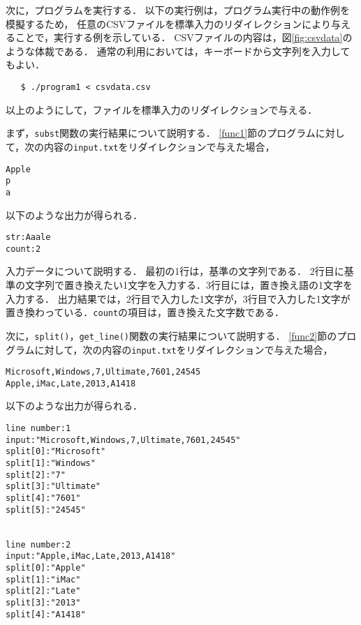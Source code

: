 次に，プログラムを実行する．
以下の実行例は，プログラム実行中の動作例を模擬するため，
任意のCSVファイルを標準入力のリダイレクションにより与えることで，実行する例を示している\cite{www:label1}．
CSVファイルの内容は，図\ref{fig:csvdata}のような体裁である．
通常の利用においては，キーボードから文字列を入力してもよい．

{\fontsize{10pt}{11pt} \selectfont
 \begin{verbatim}
   $ ./program1 < csvdata.csv
 \end{verbatim}
}

以上のようにして，ファイルを標準入力のリダイレクションで与える．

まず，\verb|subst|関数の実行結果について説明する．
\ref{func1}節のプログラムに対して，次の内容の\verb|input.txt|をリダイレクションで与えた場合，

{\fontsize{10pt}{11pt} \selectfont
 \begin{verbatim}
Apple
p
a
 \end{verbatim}
}

\noindent %
以下のような出力が得られる．

{\fontsize{10pt}{11pt} \selectfont
 \begin{verbatim}
str:Aaale
count:2
 \end{verbatim}
}

入力データについて説明する．
最初の1行は，基準の文字列である．
2行目に基準の文字列で置き換えたい1文字を入力する．3行目には，置き換え語の1文字を入力する．
出力結果では，2行目で入力した1文字が，3行目で入力した1文字が置き換わっている．\verb|count|の項目は，置き換えた文字数である．

次に，\verb|split()|，\verb|get_line()|関数の実行結果について説明する．
\ref{func2}節のプログラムに対して，次の内容の\verb|input.txt|をリダイレクションで与えた場合，

{\fontsize{10pt}{11pt} \selectfont
 \begin{verbatim}
Microsoft,Windows,7,Ultimate,7601,24545
Apple,iMac,Late,2013,A1418
 \end{verbatim}
}

\noindent %
以下のような出力が得られる．

{\fontsize{10pt}{11pt} \selectfont
 \begin{verbatim}
line number:1
input:"Microsoft,Windows,7,Ultimate,7601,24545"
split[0]:"Microsoft"
split[1]:"Windows"
split[2]:"7"
split[3]:"Ultimate"
split[4]:"7601"
split[5]:"24545"


line number:2
input:"Apple,iMac,Late,2013,A1418"
split[0]:"Apple"
split[1]:"iMac"
split[2]:"Late"
split[3]:"2013"
split[4]:"A1418"
 \end{verbatim}
}

